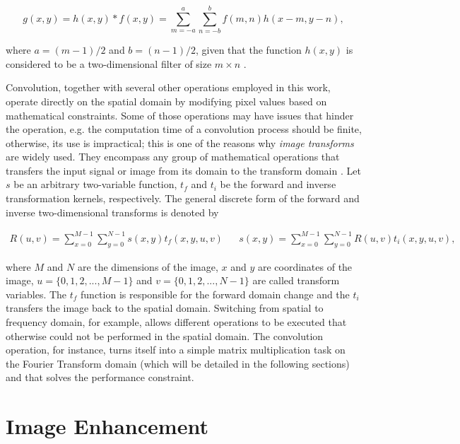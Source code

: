 \begin{equation}
\label{eqn:2d_discrete_convolution}
g(x,y) = h(x,y) \ast f(x,y) = 
        \sum_{m=-a}^{a}
        \sum_{n=-b}^{b}
        f(m,n) h(x-m,y-n),
\end{equation}

\noindent where $a = (m-1)/2$ and $b = (n-1)/2$, given that the function $h(x,y)$ is considered to be a two-dimensional filter of size $m \times n$ \cite{gonzalez2018digital}.

Convolution, together with several other operations employed in this work, operate directly on the spatial domain by modifying pixel values based on mathematical constraints. Some of those operations may have issues that hinder the operation, e.g. the computation time of a convolution process should be finite, otherwise, its use is impractical; this is one of the reasons why \emph{image transforms} are widely used. They encompass any group of mathematical operations that transfers the input signal or image from its domain to the transform domain \cite{gonzalez2008digital}. Let $s$ be an arbitrary two-variable function, $t_{f}$ and $t_{i}$ be the forward and inverse transformation kernels, respectively. The general discrete form of the forward and inverse two-dimensional transforms is denoted by 

\begin{align}
\label{eqn:generic_transform}
R(u,v) = 
\sum_{x=0}^{M-1}
\sum_{y=0}^{N-1}s(x,y)t_{f}(x,y,u,v)
&&
s(x,y) = 
\sum_{x=0}^{M-1}
\sum_{y=0}^{N-1}R(u,v)t_{i}(x,y,u,v),
\end{align}

\noindent where $M$ and $N$ are the dimensions of the image, $x$ and $y$ are coordinates of the image, $u = \{0,1,2,...,M-1\}$ and $v = \{0,1,2,...,N-1\}$ are called transform variables. The $t_{f}$ function is responsible for the forward domain change and the $t_{i}$ transfers the image back to the spatial domain. Switching from spatial to frequency domain, for example, allows different operations to be executed that otherwise could not be performed in the spatial domain. The convolution operation, for instance, turns itself into a simple matrix multiplication task on the Fourier Transform domain (which will be detailed in the following sections) and that solves the performance constraint.

\section{Image Enhancement}


